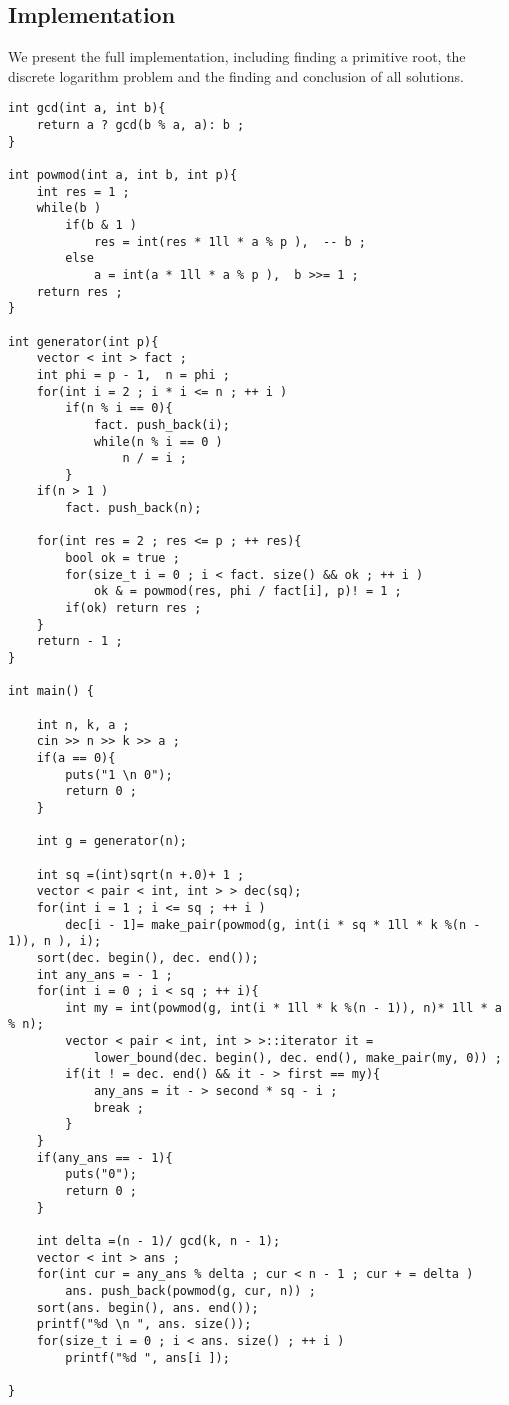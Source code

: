 \subsection{ Implementation }

We present the full implementation, including finding a primitive root, the discrete logarithm problem and the finding and conclusion of all solutions.

\begin{verbatim}
int gcd(int a, int b){
    return a ? gcd(b % a, a): b ;
}
 
int powmod(int a, int b, int p){
    int res = 1 ;
    while(b )
        if(b & 1 )
            res = int(res * 1ll * a % p ),  -- b ;
        else
            a = int(a * 1ll * a % p ),  b >>= 1 ;
    return res ;
}
 
int generator(int p){
    vector < int > fact ;
    int phi = p - 1,  n = phi ;
    for(int i = 2 ; i * i <= n ; ++ i )
        if(n % i == 0){
            fact. push_back(i);
            while(n % i == 0 )
                n / = i ;
        }
    if(n > 1 )
        fact. push_back(n);
 
    for(int res = 2 ; res <= p ; ++ res){
        bool ok = true ;
        for(size_t i = 0 ; i < fact. size() && ok ; ++ i )
            ok & = powmod(res, phi / fact[i], p)! = 1 ;
        if(ok) return res ;
    }
    return - 1 ;
}
 
int main() {
 
    int n, k, a ;
    cin >> n >> k >> a ;
    if(a == 0){
        puts("1 \n 0");
        return 0 ;
    }
 
    int g = generator(n);
 
    int sq =(int)sqrt(n +.0)+ 1 ;
    vector < pair < int, int > > dec(sq);
    for(int i = 1 ; i <= sq ; ++ i )
        dec[i - 1]= make_pair(powmod(g, int(i * sq * 1ll * k %(n - 1)), n ), i);
    sort(dec. begin(), dec. end());
    int any_ans = - 1 ;
    for(int i = 0 ; i < sq ; ++ i){
        int my = int(powmod(g, int(i * 1ll * k %(n - 1)), n)* 1ll * a % n);
        vector < pair < int, int > >::iterator it =
            lower_bound(dec. begin(), dec. end(), make_pair(my, 0)) ;
        if(it ! = dec. end() && it - > first == my){
            any_ans = it - > second * sq - i ;
            break ;
        }
    }
    if(any_ans == - 1){
        puts("0");
        return 0 ;
    }
 
    int delta =(n - 1)/ gcd(k, n - 1);
    vector < int > ans ;
    for(int cur = any_ans % delta ; cur < n - 1 ; cur + = delta )
        ans. push_back(powmod(g, cur, n)) ;
    sort(ans. begin(), ans. end());
    printf("%d \n ", ans. size());
    for(size_t i = 0 ; i < ans. size() ; ++ i )
        printf("%d ", ans[i ]);
 
} 
\end{verbatim}
